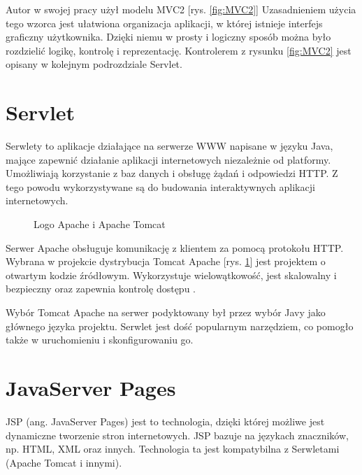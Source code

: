 \documentclass[eng,printmode,oneside]{mgr}
\begin{document}
Autor w swojej pracy użył modelu MVC2 [rys. \ref{fig:MVC2}]
Uzasadnieniem użycia tego wzorca jest ułatwiona organizacja aplikacji, w której
istnieje interfejs graficzny użytkownika. Dzięki niemu w prosty i logiczny
sposób można było rozdzielić logikę, kontrolę i reprezentację. Kontrolerem z
rysunku \ref{fig:MVC2} jest opisany w kolejnym podrozdziale Servlet.

\newpage
\section{Servlet}

Serwlety to aplikacje działające na serwerze WWW napisane w języku Java, mające
zapewnić działanie aplikacji internetowych niezależnie od platformy.
Umożliwiają korzystanie z baz danych i obsługę żądań i odpowiedzi HTTP. Z tego
powodu wykorzystywane są do budowania interaktywnych aplikacji internetowych.

\begin{figure}
\centering
{}
\caption{\label{fig:apache}Logo Apache i Apache Tomcat \cite{apache.org,tomcat.org}}
\end{figure}

Serwer Apache obsługuje komunikację z klientem za pomocą protokołu HTTP. Wybrana
w projekcie dystrybucja Tomcat Apache [rys. \ref{fig:apache}] jest projektem o
otwartym kodzie źródłowym. Wykorzystuje wielowątkowość, jest skalowalny i
bezpieczny oraz zapewnia kontrolę dostępu \cite{apache.org}.

Wybór Tomcat Apache na serwer podyktowany był przez wybór Javy jako głównego
języka projektu. Serwlet jest dość popularnym narzędziem, co pomogło także w
uruchomieniu i skonfigurowaniu go.

\section{JavaServer Pages}

JSP (ang. JavaServer Pages) jest to technologia, dzięki której możliwe jest
dynamiczne tworzenie stron internetowych. JSP bazuje na językach znaczników,
np.
HTML, XML oraz innych. Technologia ta jest kompatybilna z Serwletami (Apache
Tomcat i innymi).
\end{document}
